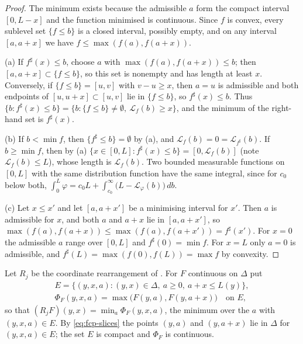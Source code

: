 \begin{proof}
The minimum exists because the admissible $a$ form the compact interval $[0,L-x]$ and the function minimised is
continuous. Since $f$ is convex, every sublevel set $\{f\le b\}$ is a closed interval, possibly empty, and on any
interval $[a,a+x]$ we have $f\le\max(f(a),f(a+x))$.

(a) If $f^\sharp(x)\le b$, choose $a$ with $\max(f(a),f(a+x))\le b$; then $[a,a+x]\subset\{f\le b\}$, so this set is
nonempty and has length at least $x$. Conversely, if $\{f\le b\}=[u,v]$ with $v-u\ge x$, then $a=u$ is admissible
and both endpoints of $[u,u+x]\subset[u,v]$ lie in $\{f\le b\}$, so $f^\sharp(x)\le b$. Thus
$\{b:f^\sharp(x)\le b\}=\{b:\{f\le b\}\ne\emptyset,\ \mathcal L_f(b)\ge x\}$, and the minimum of the right-hand set is
$f^\sharp(x)$.

(b) If $b<\min f$, then $\{f^\sharp\le b\}=\emptyset$ by (a), and $\mathcal L_f(b)=0=\mathcal L_{f^\sharp}(b)$. If
$b\ge\min f$, then by (a) $\{x\in[0,L]:f^\sharp(x)\le b\}=[0,\mathcal L_f(b)]$ (note $\mathcal L_f(b)\le L$), whose
length is $\mathcal L_f(b)$. Two bounded measurable functions on $[0,L]$ with the same distribution function have the
same integral, since for $c_0$ below both, $\int_0^L\varphi=c_0L+\int_{c_0}^\infty\bigl(L-\mathcal L_\varphi(b)\bigr)\,db$.

(c) Let $x\le x'$ and let $[a,a+x']$ be a minimising interval for $x'$. Then $a$ is admissible for $x$, and both
$a$ and $a+x$ lie in $[a,a+x']$, so $\max(f(a),f(a+x))\le\max(f(a),f(a+x'))=f^\sharp(x')$. For $x=0$ the admissible
$a$ range over $[0,L]$ and $f^\sharp(0)=\min f$. For $x=L$ only $a=0$ is admissible, and
$f^\sharp(L)=\max(f(0),f(L))=\max f$ by convexity.
\end{proof}

Let $R_j$ be the coordinate rearrangement of . For $F$ continuous on $\Delta$
put
\begin{gather*}
 E=\{(y,x,a):(y,x)\in\Delta,\ a\ge0,\ a+x\le L(y)\},\\
 \Phi_F(y,x,a)=\max\bigl(F(y,a),F(y,a+x)\bigr)\quad\text{on }E,
\end{gather*}
so that $(R_jF)(y,x)=\min_a\Phi_F(y,x,a)$, the minimum over the $a$ with $(y,x,a)\in E$. By \eqref{eq:fcp-slices} the
points $(y,a)$ and $(y,a+x)$ lie in $\Delta$ for $(y,x,a)\in E$; the set $E$ is compact and $\Phi_F$ is continuous.

